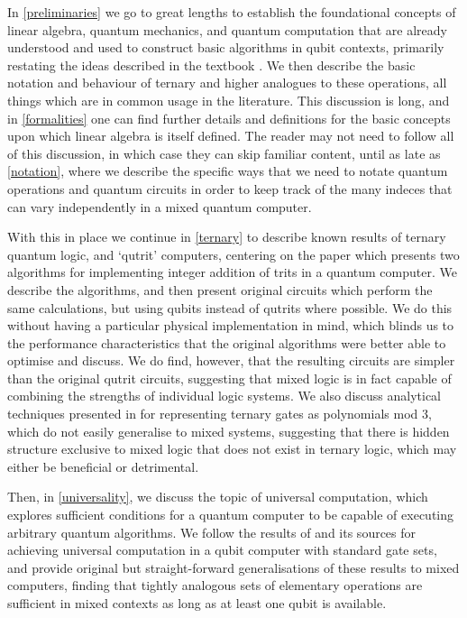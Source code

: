In \autoref{preliminaries} we go to great lengths to establish the foundational concepts of linear algebra, quantum mechanics, and quantum computation that are already understood and used to construct basic algorithms in qubit contexts, primarily restating the ideas described in the textbook \cite{textbook}. We then describe the basic notation and behaviour of ternary and higher analogues to these operations, all things which are in common usage in the literature. This discussion is long, and in \autoref{formalities} one can find further details and definitions for the basic concepts upon which linear algebra is itself defined. The reader may not need to follow all of this discussion, in which case they can skip familiar content, until as late as \autoref{notation}, where we describe the specific ways that we need to notate quantum operations and quantum circuits in order to keep track of the many indeces that can vary independently in a mixed quantum computer.

With this in place we continue in \autoref{ternary} to describe known results of ternary quantum logic, and `qutrit' computers, centering on the paper \cite{arithmetics} which presents two algorithms for implementing integer addition of trits in a quantum computer. We describe the algorithms, and then present original circuits which perform the same calculations, but using qubits instead of qutrits where possible. We do this without having a particular physical implementation in mind, which blinds us to the performance characteristics that the original algorithms were better able to optimise and discuss. We do find, however, that the resulting circuits are simpler than the original qutrit circuits, suggesting that mixed logic is in fact capable of combining the strengths of individual logic systems. We also discuss analytical techniques presented in \cite{arithmetics} for representing ternary gates as polynomials mod 3, which do not easily generalise to mixed systems, suggesting that there is hidden structure exclusive to mixed logic that does not exist in ternary logic, which may either be beneficial or detrimental.

Then, in \autoref{universality}, we discuss the topic of universal computation, which explores sufficient conditions for a quantum computer to be capable of executing arbitrary quantum algorithms. We follow the results of \cite{textbook} and its sources \cite{cnot-decomposition, universal-qubit} for achieving universal computation in a qubit computer with standard gate sets, and provide original but straight-forward generalisations of these results to mixed computers, finding that tightly analogous sets of elementary operations are sufficient in mixed contexts as long as at least one qubit is available.

